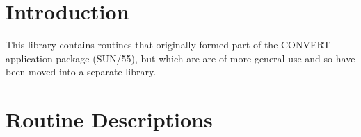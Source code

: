 \documentclass[11pt,nolof]{starlink}
\begin{document}
\scfrontmatter

\section {Introduction}

This library contains routines that originally formed part of the CONVERT
application package (SUN/55), but which are are of more general use and so have
been moved into a separate library.

\appendix
\section{\label{APP:SPEC}Routine Descriptions}

\small
\end{document}
